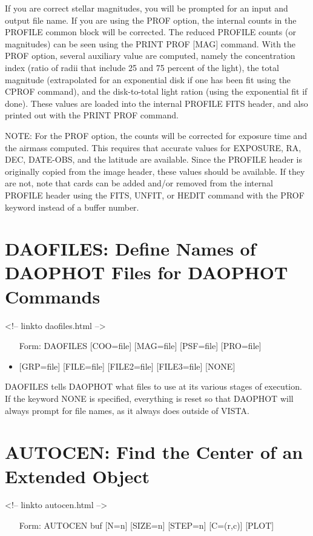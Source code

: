 If you are correct stellar magnitudes, you will be prompted for an input
and output file name.  If you are using the PROF option, the internal
counts in the PROFILE common block will be corrected.  The reduced PROFILE
counts (or magnitudes) can be seen using the PRINT PROF {[MAG]}
command. With the PROF option, several auxiliary value are computed, namely
the concentration index (ratio of radii that include 25 and 75 percent of
the light), the total magnitude (extrapolated for an exponential disk if
one has been fit using the CPROF command), and the disk-to-total light
ration (using the exponential fit if done). These values are loaded into
the internal PROFILE FITS header, and also printed out with the PRINT PROF
command.

NOTE: For the PROF option, the counts will be corrected for exposure time
and the airmass computed. This requires that accurate values for EXPOSURE,
RA, DEC, DATE-OBS, and the latitude are available. Since the PROFILE header
is originally copied from the image header, these values should be
available. If they are not, note that cards can be added and/or removed
from the internal PROFILE header using the FITS, UNFIT, or HEDIT command
with the PROF keyword instead of a buffer number.

\section{DAOFILES: Define Names of DAOPHOT Files for DAOPHOT Commands}
\begin{rawhtml}
<!-- linkto daofiles.html -->
\end{rawhtml}
\begin{itemize}
  \item[Form: DAOFILES {[COO=file]} {[MAG=file]} {[PSF=file]} {[PRO=file]}\hfill]{}
  \item{{[GRP=file]} {[FILE=file]} {[FILE2=file]} {[FILE3=file]} {[NONE]}}
\end{itemize}

DAOFILES tells DAOPHOT what files to use at its various stages of
execution. If the keyword NONE is specified, everything is reset so that
DAOPHOT will always prompt for file names, as it always does outside of
VISTA.

\section{AUTOCEN: Find the Center of an Extended Object}
\begin{rawhtml}
<!-- linkto autocen.html -->
\end{rawhtml}
\begin{itemize}
  \item[Form: AUTOCEN buf {[N=n]} {[SIZE=n]} {[STEP=n]} {[C=(r,c)]} 
       {[PLOT]}\hfill]{}
\end{itemize}

